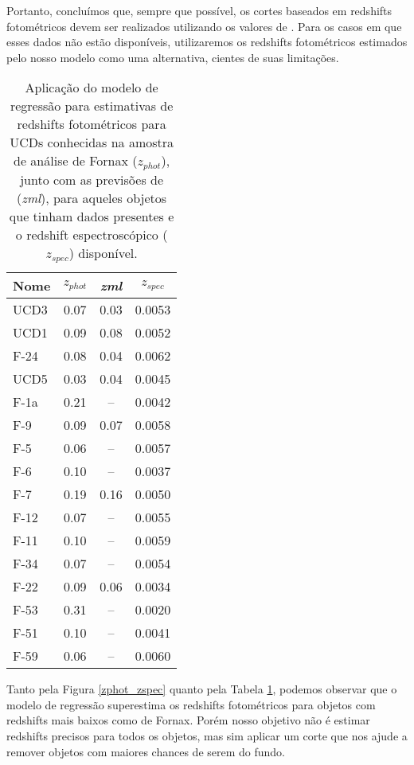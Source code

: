 Portanto, concluímos que, sempre que possível, os cortes baseados em redshifts fotométricos devem ser realizados utilizando os valores de \cite{erik_photoz_2024}. Para os casos em que esses dados não estão disponíveis, utilizaremos os redshifts fotométricos estimados pelo nosso modelo como uma alternativa, cientes de suas limitações.

\begin{table}[!ht]
    \centering
    \caption{Aplicação do modelo de regressão para estimativas de redshifts fotométricos para UCDs conhecidas na amostra de análise de Fornax (\textit{$z_{phot}$}), junto com as previsões de \citep{erik_photoz_2024} (\textit{zml}), para aqueles objetos que tinham dados presentes e o redshift espectroscópico (\textit{$z_{spec}$}) disponível.}
    \begin{tabular}{lccc}
        \toprule
        Nome & \textit{$z_{phot}$} & \textit{zml} & \textit{$z_{spec}$}\\
        \midrule
        UCD3 & 0.07 & 0.03 & 0.0053\\
        UCD1 & 0.09 & 0.08 & 0.0052\\
        F-24 & 0.08 & 0.04 & 0.0062\\
        UCD5 & 0.03 & 0.04 & 0.0045\\
        F-1a & 0.21 & -- & 0.0042\\
        F-9 & 0.09 & 0.07 & 0.0058\\
        F-5 & 0.06 & -- & 0.0057\\
        F-6 & 0.10 & -- & 0.0037\\
        F-7 & 0.19 & 0.16 & 0.0050\\
        F-12 & 0.07 & -- & 0.0055\\
        F-11 & 0.10 & -- & 0.0059\\
        F-34 & 0.07 & -- & 0.0054\\ 
        F-22 & 0.09 & 0.06 & 0.0034\\
        F-53 & 0.31 & -- & 0.0020\\
        F-51 & 0.10 & -- & 0.0041\\
        F-59 & 0.06 & -- & 0.0060\\
        \midrule
    \end{tabular}
    \label{ucds_zphot}
\end{table}

Tanto pela Figura \ref{zphot_zspec} quanto pela Tabela \ref{ucds_zphot}, podemos observar que o modelo de regressão superestima os redshifts fotométricos para objetos com redshifts mais baixos como de Fornax. Porém nosso objetivo não é estimar redshifts precisos para todos os objetos, mas sim aplicar um corte que nos ajude a remover objetos com maiores chances de serem do fundo.

